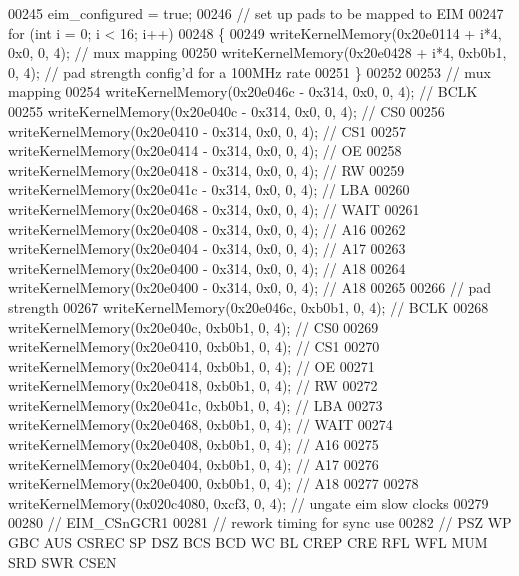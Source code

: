 \begin{DoxyCode}
{{{{00245     eim_configured = \textcolor{keyword}{true};
00246     \textcolor{comment}{// set up pads to be mapped to EIM}
00247     \textcolor{keywordflow}{for} (\textcolor{keywordtype}{int} i = 0; i < 16; i++)
00248     \{
00249         writeKernelMemory(0x20e0114 + i*4, 0x0, 0, 4); \textcolor{comment}{// mux mapping}
00250         writeKernelMemory(0x20e0428 + i*4, 0xb0b1, 0, 4); \textcolor{comment}{// pad strength config'd for a 100MHz rate}
00251     \}
00252 
00253     \textcolor{comment}{// mux mapping}
00254     writeKernelMemory(0x20e046c - 0x314, 0x0, 0, 4); \textcolor{comment}{// BCLK}
00255     writeKernelMemory(0x20e040c - 0x314, 0x0, 0, 4); \textcolor{comment}{// CS0}
00256     writeKernelMemory(0x20e0410 - 0x314, 0x0, 0, 4); \textcolor{comment}{// CS1}
00257     writeKernelMemory(0x20e0414 - 0x314, 0x0, 0, 4); \textcolor{comment}{// OE}
00258     writeKernelMemory(0x20e0418 - 0x314, 0x0, 0, 4); \textcolor{comment}{// RW}
00259     writeKernelMemory(0x20e041c - 0x314, 0x0, 0, 4); \textcolor{comment}{// LBA}
00260     writeKernelMemory(0x20e0468 - 0x314, 0x0, 0, 4); \textcolor{comment}{// WAIT}
00261     writeKernelMemory(0x20e0408 - 0x314, 0x0, 0, 4); \textcolor{comment}{// A16}
00262     writeKernelMemory(0x20e0404 - 0x314, 0x0, 0, 4); \textcolor{comment}{// A17}
00263     writeKernelMemory(0x20e0400 - 0x314, 0x0, 0, 4); \textcolor{comment}{// A18}
00264     writeKernelMemory(0x20e0400 - 0x314, 0x0, 0, 4); \textcolor{comment}{// A18}
00265 
00266     \textcolor{comment}{// pad strength}
00267     writeKernelMemory(0x20e046c, 0xb0b1, 0, 4); \textcolor{comment}{// BCLK}
00268     writeKernelMemory(0x20e040c, 0xb0b1, 0, 4); \textcolor{comment}{// CS0}
00269     writeKernelMemory(0x20e0410, 0xb0b1, 0, 4); \textcolor{comment}{// CS1}
00270     writeKernelMemory(0x20e0414, 0xb0b1, 0, 4); \textcolor{comment}{// OE}
00271     writeKernelMemory(0x20e0418, 0xb0b1, 0, 4); \textcolor{comment}{// RW}
00272     writeKernelMemory(0x20e041c, 0xb0b1, 0, 4); \textcolor{comment}{// LBA}
00273     writeKernelMemory(0x20e0468, 0xb0b1, 0, 4); \textcolor{comment}{// WAIT}
00274     writeKernelMemory(0x20e0408, 0xb0b1, 0, 4); \textcolor{comment}{// A16}
00275     writeKernelMemory(0x20e0404, 0xb0b1, 0, 4); \textcolor{comment}{// A17}
00276     writeKernelMemory(0x20e0400, 0xb0b1, 0, 4); \textcolor{comment}{// A18}
00277 
00278     writeKernelMemory(0x020c4080, 0xcf3, 0, 4); \textcolor{comment}{// ungate eim slow clocks}
00279 
00280     \textcolor{comment}{// EIM\_CSnGCR1}
00281     \textcolor{comment}{// rework timing for sync use}
00282     \textcolor{comment}{// PSZ WP GBC AUS CSREC SP DSZ BCS BCD WC BL CREP CRE RFL WFL MUM SRD SWR CSEN}
}}}}
\end{DoxyCode}

